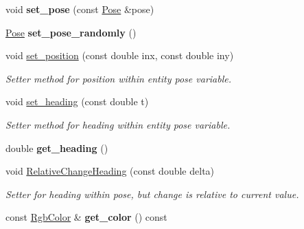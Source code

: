 \begin{DoxyCompactItemize}
\item 
void {\bfseries set\+\_\+pose} (const \hyperlink{structPose}{Pose} \&pose)\hypertarget{classArenaEntity_a6eb76e5f1b5949314c12cc512d6930ae}{}\label{classArenaEntity_a6eb76e5f1b5949314c12cc512d6930ae}

\item 
\hyperlink{structPose}{Pose} {\bfseries set\+\_\+pose\+\_\+randomly} ()\hypertarget{classArenaEntity_ab46d992b0e7de661bc147bcf7b1df403}{}\label{classArenaEntity_ab46d992b0e7de661bc147bcf7b1df403}

\item 
void \hyperlink{classArenaEntity_a3136704edf07c24639319abf5c28dac0}{set\+\_\+position} (const double inx, const double iny)\hypertarget{classArenaEntity_a3136704edf07c24639319abf5c28dac0}{}\label{classArenaEntity_a3136704edf07c24639319abf5c28dac0}

\begin{DoxyCompactList}\small\item\em Setter method for position within entity pose variable. \end{DoxyCompactList}\item 
void \hyperlink{classArenaEntity_ac1cc3c6997bc7a9573128fc5ded9eb72}{set\+\_\+heading} (const double t)\hypertarget{classArenaEntity_ac1cc3c6997bc7a9573128fc5ded9eb72}{}\label{classArenaEntity_ac1cc3c6997bc7a9573128fc5ded9eb72}

\begin{DoxyCompactList}\small\item\em Setter method for heading within entity pose variable. \end{DoxyCompactList}\item 
double {\bfseries get\+\_\+heading} ()\hypertarget{classArenaEntity_a10b14aac21bfe22a64037f03f43846bd}{}\label{classArenaEntity_a10b14aac21bfe22a64037f03f43846bd}

\item 
void \hyperlink{classArenaEntity_a4c4bd7f5ffb778979303c33cb3bc9986}{Relative\+Change\+Heading} (const double delta)
\begin{DoxyCompactList}\small\item\em Setter for heading within pose, but change is relative to current value. \end{DoxyCompactList}\item 
const \hyperlink{structRgbColor}{Rgb\+Color} \& {\bfseries get\+\_\+color} () const \hypertarget{classArenaEntity_a9ba62519f6c6294373fdc8488713b4e0}{}\label{classArenaEntity_a9ba62519f6c6294373fdc8488713b4e0}


\end{DoxyCompactItemize}
